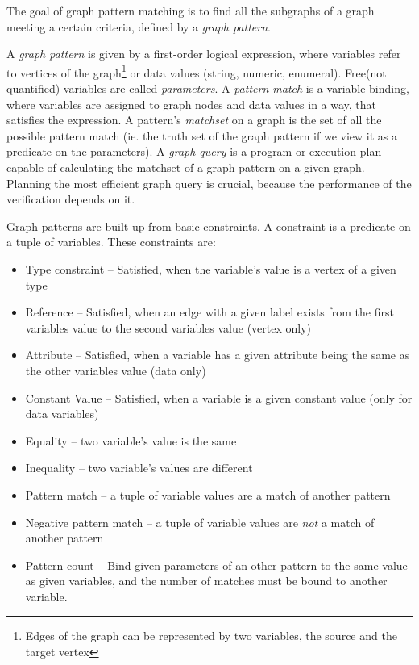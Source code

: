 
The goal of graph pattern matching is to find all the subgraphs of a graph meeting a certain criteria, defined by a \emph{graph pattern}.

A \emph{graph pattern} is given by a first-order logical expression, where variables refer to vertices of the graph\footnote{Edges of the graph can be represented by two variables, the source and the target vertex} or data values (string, numeric, enumeral).
Free(not quantified) variables are called \emph{parameters}.  
A \emph{pattern match} is a variable binding, where variables are assigned to graph nodes and data values in a way, that satisfies the expression.
A pattern's \emph{matchset} on a graph is the set of all the possible pattern match (ie. the truth set of the graph pattern if we view it as a predicate on the parameters).
A \emph{graph query} is a program or execution plan capable of calculating the matchset of a graph pattern on a given graph. 
Planning the most efficient graph query is crucial, because the performance of the verification depends on it.

Graph patterns are built up from basic constraints. 
A constraint is a predicate on a tuple of variables. 
These constraints are: 

\begin{itemize}
	\item Type constraint -- Satisfied, when the variable's value is a vertex of a given type
	\item Reference -- Satisfied, when an edge with a given label exists from the first variables value to the second variables value (vertex only)
	\item Attribute -- Satisfied, when a variable has a given attribute being the same as the other variables value (data only)
	\item Constant Value -- Satisfied, when a variable is a given constant value (only for data variables)
	\item Equality -- two variable's value is the same
	\item Inequality -- two variable's values are different
	\item Pattern match -- a tuple of variable values are a match of another pattern	
	\item Negative pattern match -- a tuple of variable values are \emph{not} a match of another pattern
	\item Pattern count -- Bind given parameters of an other pattern to the same value as given variables, and the number of matches must be bound to another variable.
\end{itemize}


